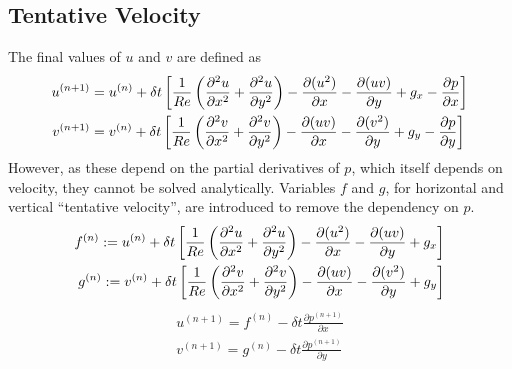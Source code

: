 \subsection{Tentative Velocity}
The final values of $u$ and $v$ are defined as
\begin{equation}
\begin{aligned}
    u^{(n+1)} &= u^{(n)} + \delta{t}
    \left[
        \frac{1}{Re}
        \left(\frac{\partial{^2u}}{\partial{x^2}} + \frac{\partial{^2u}}{\partial{y^2}}\right) - \frac{\partial{(u^2)}}{\partial{x}} - \frac{\partial{(uv)}}{\partial{y}} + g_x - \frac{\partial{p}}{\partial{x}}
    \right] \\
    v^{(n+1)} &= v^{(n)} + \delta{t}
    \left[
        \frac{1}{Re}
        \left(\frac{\partial{^2v}}{\partial{x^2}} + \frac{\partial{^2v}}{\partial{y^2}}\right) - \frac{\partial{(uv)}}{\partial{x}} - \frac{\partial{(v^2)}}{\partial{y}} + g_y - \frac{\partial{p}}{\partial{y}}
    \right]
\end{aligned}
\end{equation}
However, as these depend on the partial derivatives of $p$, which itself depends on velocity, they cannot be solved analytically.
Variables $f$ and $g$, for horizontal and vertical ``tentative velocity'', are introduced to remove the dependency on $p$.
\begin{equation}
\begin{aligned}
    f^{(n)} := u^{(n)} + \delta{t}
    \left[
        \frac{1}{Re}
        \left(\frac{\partial{^2u}}{\partial{x^2}} + \frac{\partial{^2u}}{\partial{y^2}}\right) - \frac{\partial{(u^2)}}{\partial{x}} - \frac{\partial{(uv)}}{\partial{y}} + g_x
    \right] \\
    g^{(n)} := v^{(n)} + \delta{t}
    \left[
        \frac{1}{Re}
        \left(\frac{\partial{^2v}}{\partial{x^2}} + \frac{\partial{^2v}}{\partial{y^2}}\right) - \frac{\partial{(uv)}}{\partial{x}} - \frac{\partial{(v^2)}}{\partial{y}} + g_y
    \right]
\end{aligned}
\end{equation}
\begin{equation}
\begin{aligned}
    u^{(n+1)} = f^{(n)} - \delta{t}\frac{\partial{p^{(n+1)}}}{\partial{x}} \\
    v^{(n+1)} = g^{(n)} - \delta{t}\frac{\partial{p^{(n+1)}}}{\partial{y}}
    \label{eq:uv_modified}
\end{aligned}
\end{equation}

